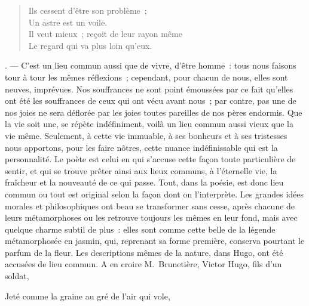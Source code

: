 \documentclass[french,twoside]{book} %
\begin{document}
{\begin{verse}
Ils cessent d’être son problème ;\\
Un astre est un voile.\\
Il veut mieux ; reçoit de leur rayon même\\
Le regard qui va plus loin qu’eux.\\
\end{verse}
}. — C’est un lieu commun aussi que de vivre, d’être homme : tous nous faisons tour à tour les mêmes réflexions ; cependant, pour chacun de nous, elles sont neuves, imprévues. Nos souffrances ne sont point émoussées par ce fait qu’elles ont été les souffrances de ceux qui ont vécu avant nous ; par contre, pas une de nos joies ne sera déflorée par les joies toutes pareilles de nos pères endormis. Que la vie soit une, se répète indéfiniment, voilà un lieu commun aussi vieux que la vie même. Seulement, à cette vie immuable, à ses bonheurs et à ses tristesses nous apportons, pour les faire nôtres, cette nuance indéfinissable qui est la personnalité. Le poète est celui en qui s’accuse cette façon toute particulière de sentir, et qui se trouve prêter ainsi aux lieux communs, à l’éternelle vie, la fraîcheur et la nouveauté de ce qui passe. Tout, dans la poésie, est donc lieu commun ou tout est original selon la façon dont on l’interprète. Les grandes idées morales et philosophiques ont beau se transformer sans cesse, après chacune de leurs métamorphoses ou les retrouve toujours les mêmes en leur fond, mais avec quelque charme subtil de plus : elles sont comme cette belle de la légende métamorphosée en jasmin, qui, reprenant sa forme première, conserva pourtant le parfum de la fleur. Les descriptions mêmes de la nature, dans Hugo, ont été accusées de lieu commun. A en croire M. Brunetière, Victor Hugo, fils d’un soldat,\par

Jeté comme la graine au gré de l’air qui vole,\\
\end{document}
